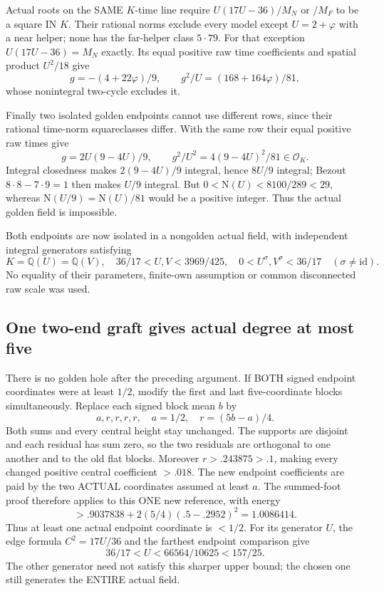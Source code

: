 Actual roots on the SAME \(K\)-time line require
\(U(17U-36)/M_N\) or \(/M_F\) to be a square IN \(K\).
Their rational norms exclude every model except \(U=2+\varphi\)
with a near helper; none has the far-helper class \(5\cdot79\).
For that exception \(U(17U-36)=M_N\) exactly.
Its equal positive raw time coefficients and spatial product
\(U^2/18\) give
\[
 g=-(4+22\varphi)/9,\qquad
 g^2/U=(168+164\varphi)/81,
\]
whose nonintegral two-cycle excludes it.

Finally two isolated golden endpoints cannot use different rows,
since their rational time-norm squareclasses differ.
With the same row their equal positive raw times give
\[
 g=2U(9-4U)/9,\qquad g^2/U^2=4(9-4U)^2/81\in\mathcal O_K .
\]
Integral closedness makes \(2(9-4U)/9\) integral, hence
\(8U/9\) integral; Bezout \(8\cdot8-7\cdot9=1\)
then makes \(U/9\) integral.
But \(0<\mathrm N(U)<8100/289<29\), whereas
\(\mathrm N(U/9)=\mathrm N(U)/81\) would be a positive integer.
Thus the actual golden field is impossible.

Both endpoints are now isolated in a nongolden actual field,
with independent integral generators satisfying
\[
 K=\mathbb Q(U)=\mathbb Q(V),\quad
 36/17<U,V<3969/425,\quad
 0<U^\sigma,V^\sigma<36/17\quad(\sigma\ne\mathrm{id}).
\tag{A17isolated}\label{eq:arithA17isolated}
\]
No equality of their parameters, finite-own assumption or common
disconnected raw scale was used.

\subsection{One two-end graft gives actual degree at most five}
\label{app:arithA17degree}

There is no golden hole after the preceding argument.
If BOTH signed endpoint coordinates were at least \(1/2\),
modify the first and last five-coordinate blocks simultaneously.
Replace each signed block mean \(b\) by
\[
             a,r,r,r,r,\quad a=1/2,\quad r=(5b-a)/4 .
\]
Both sums and every central height stay unchanged.
The supports are disjoint and each residual has sum zero,
so the two residuals are orthogonal to one another and to the
old flat blocks.
Moreover \(r>.243875>.1\), making every changed positive
central coefficient \(>.018\).
The new endpoint coefficients are paid by the two ACTUAL
coordinates assumed at least \(a\).
The summed-foot proof therefore applies to this ONE new reference,
with energy
\[
 >.9037838+2(5/4)(.5-.2952)^2
 =1.0086414 .
\]
Thus at least one actual endpoint coordinate is \(<1/2\).
For its generator \(U\), the edge formula
\(C^2=17U/36\) and the farthest endpoint comparison give
\[
                  36/17<U<66564/10625<157/25.
\tag{A17shortU}\label{eq:arithA17shortU}
\]
The other generator need not satisfy this sharper upper bound;
the chosen one still generates the ENTIRE actual field.

